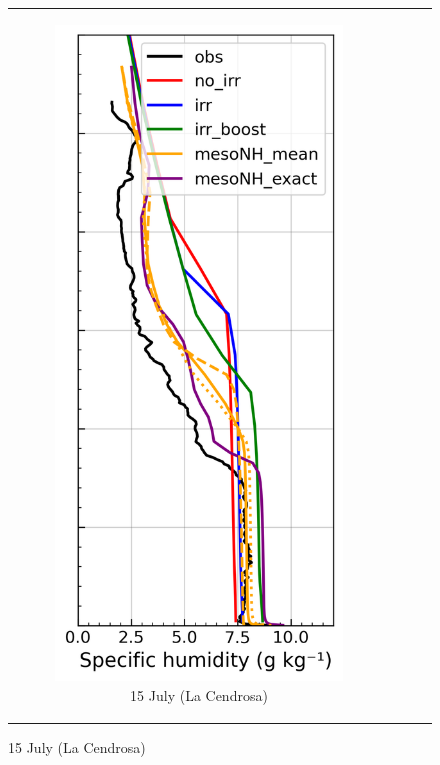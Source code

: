 \begin{figure}[hbtp]
{\begin{tabular}{@{}cccc@{}}
        \begin{subfigure}[t]{0.29\textwidth}
            \caption{15 July (La Cendrosa)}
            \includegraphics[width=\textwidth]{images/chap5/profiles/profile_cendrosa_ovap_1507_sensbins.png}

\end{subfigure}
\end{tabular}}
\end{figure}
